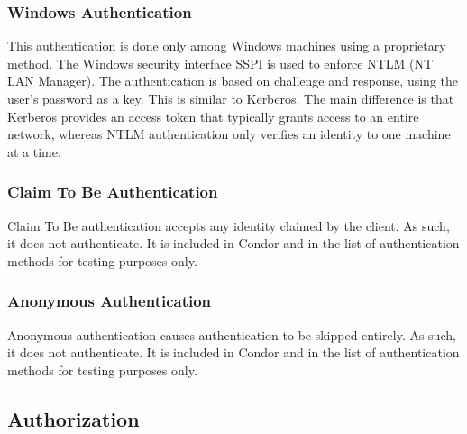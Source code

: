 \subsubsection{\label{sec:NTSSPI-Authentication}Windows Authentication}
This authentication is done only among Windows machines using
a proprietary method.
The Windows security interface SSPI is used to enforce NTLM
(NT LAN Manager).
The authentication is based on challenge and response, using the user's
password as a key.
This is similar to Kerberos.
The main difference 
is that Kerberos provides an access token that typically grants
access to an entire network, whereas NTLM authentication only 
verifies an identity to one machine at a time.

\subsubsection{\label{sec:CLAIM-Authentication}Claim To Be Authentication}
Claim To Be authentication accepts any identity claimed by the client.
As such, it does not authenticate.
It is included in Condor and in the list of authentication methods
for testing purposes only.

\subsubsection{\label{sec:ANON-Authentication}Anonymous Authentication}
Anonymous authentication causes authentication to be skipped entirely.
As such, it does not authenticate.
It is included in Condor and in the list of authentication methods
for testing purposes only.


\subsection{\label{sec:Security-Authorization} Authorization}

